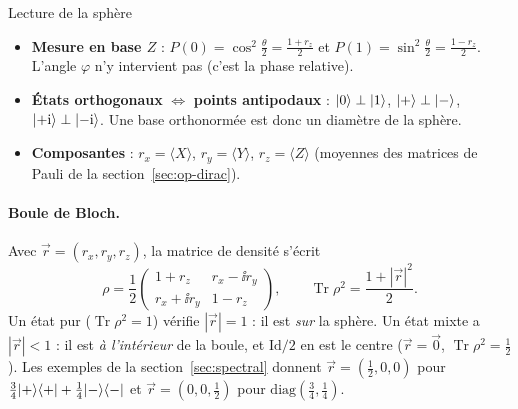 \begin{resultat}{Lecture de la sphère}
\begin{itemize}[nosep]
  \item \textbf{Mesure en base $Z$} : $P(0)=\cos^2\frac\theta2=\frac{1+r_z}{2}$ et
        $P(1)=\sin^2\frac\theta2=\frac{1-r_z}{2}$. L'angle $\varphi$ n'y intervient pas
        (c'est la phase relative).
  \item \textbf{États orthogonaux} $\Leftrightarrow$ \textbf{points antipodaux} :
        $|0\rangle\perp|1\rangle$, $|+\rangle\perp|-\rangle$, $|{+}\mathrm{i}\rangle\perp|{-}\mathrm{i}\rangle$.
        Une base orthonormée est donc un diamètre de la sphère.
  \item \textbf{Composantes} : $r_x=\langle X\rangle$, $r_y=\langle Y\rangle$,
        $r_z=\langle Z\rangle$ (moyennes des matrices de Pauli de la
        section~\ref{sec:op-dirac}).
\end{itemize}
\end{resultat}

\paragraph{Boule de Bloch.} Avec $\vec r=(r_x,r_y,r_z)$, la matrice de densité s'écrit
\[
  \rho=\frac12\begin{pmatrix}1+r_z & r_x-\ii r_y\\ r_x+\ii r_y & 1-r_z\end{pmatrix},
  \qquad
  \operatorname{Tr}\rho^2=\frac{1+|\vec r|^2}{2}.
\]
Un état pur ($\operatorname{Tr}\rho^2=1$) vérifie $|\vec r|=1$ : il est \emph{sur} la
sphère. Un état mixte a $|\vec r|<1$ : il est \emph{à l'intérieur} de la boule, et
$\mathrm{Id}/2$ en est le centre ($\vec r=\vec0$, $\operatorname{Tr}\rho^2=\frac12$). Les
exemples de la section~\ref{sec:spectral} donnent $\vec r=(\frac12,0,0)$ pour
$\frac34|+\rangle\langle +|+\frac14|-\rangle\langle -|$ et $\vec r=(0,0,\frac12)$ pour
$\mathrm{diag}(\frac34,\frac14)$.

